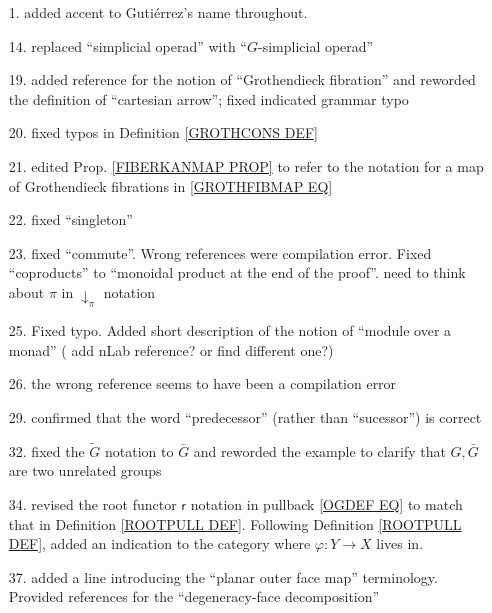 \documentclass{article}
\begin{document}
\begin{itemize}
\item[1.] added accent to Guti\'{e}rrez's name throughout.

\item[14.] replaced ``simplicial operad'' with  ``$G$-simplicial operad''

\item[19.] added reference for the notion of ``Grothendieck fibration'' and reworded the definition of ``cartesian arrow''; fixed indicated grammar typo

\item[20.] fixed typos in Definition \ref{GROTHCONS DEF}

\item[21.] edited Prop. \ref{FIBERKANMAP PROP} to refer to the notation for a map of Grothendieck fibrations in \eqref{GROTHFIBMAP EQ}

\item[22.] fixed ``singleton''

\item[23.] fixed ``commute''. Wrong references were compilation error.
Fixed ``coproducts'' to ``monoidal product at the end of the proof''. {\color{red} need to think about $\pi$ in $\downarrow_{\pi}$ notation}

\item[25.] Fixed typo. Added short description of the notion of ``module over a monad'' ({\color{red} add nLab reference? or find different one?})

\item[26.] the wrong reference seems to have been a compilation error

\item[29.] confirmed that the word ``predecessor'' (rather than ``sucessor'') is correct

\item[32.] fixed the $\tilde{G}$ notation to $\bar{G}$ and reworded the example to clarify that $G,\bar{G}$ are two unrelated groups

\item[34.] revised the root functor $\mathsf{r}$ notation in pullback \eqref{OGDEF EQ} 
to match that in Definition \ref{ROOTPULL DEF}.
Following Definition \ref{ROOTPULL DEF},
added an indication to the category where 
$\varphi \colon Y \to X$ lives in.

\item[37.] added a line introducing the ``planar outer face map'' terminology. Provided references for the ``degeneracy-face decomposition'' 


\end{itemize}
\end{document}
